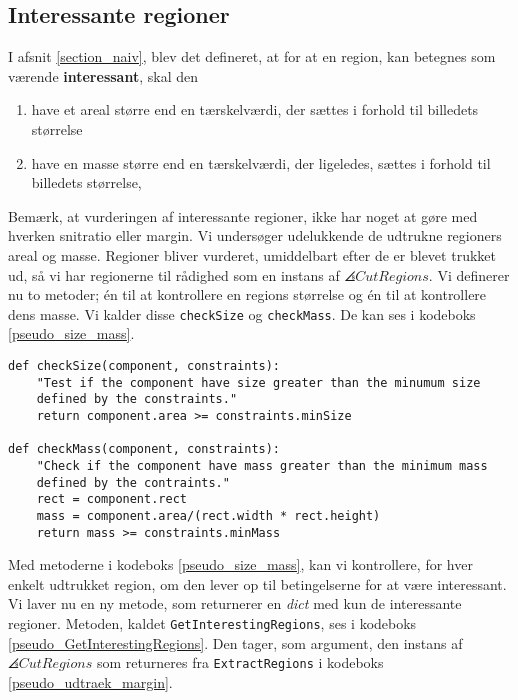 {\subsection{Interessante regioner}
I afsnit \ref{section_naiv}, blev det defineret, at for at en region,
kan betegnes som værende \textbf{interessant}, skal den
\begin{enumerate}
        \renewcommand{\labelenumi}{(\alph{enumi})}
    \item have et areal større end en tærskelværdi, der sættes i
        forhold til billedets størrelse
    \item have en masse større end en tærskelværdi, der ligeledes,
        sættes i forhold til billedets størrelse,
\end{enumerate}
Bemærk, at vurderingen af interessante regioner, ikke har noget at gøre
med hverken snitratio eller margin. Vi undersøger udelukkende de
udtrukne regioners areal og masse. Regioner bliver vurderet, umiddelbart
efter de er blevet trukket ud, så vi har regionerne til rådighed som en
instans af $\angles{CutRegions}$. Vi definerer nu to metoder; én til at
kontrollere en regions størrelse og én til at kontrollere dens masse. Vi
kalder disse \texttt{checkSize} og \texttt{checkMass}. De kan ses i
kodeboks \ref{pseudo_size_mass}.

\begin{lstlisting}[caption={Pseudokode},captionpos=b,label={pseudo_size_mass},
    frame=tb, breaklines=false, float=h]
def checkSize(component, constraints):
    "Test if the component have size greater than the minumum size
    defined by the constraints."
    return component.area >= constraints.minSize

def checkMass(component, constraints):
    "Check if the component have mass greater than the minimum mass
    defined by the contraints."
    rect = component.rect
    mass = component.area/(rect.width * rect.height)
    return mass >= constraints.minMass
\end{lstlisting}

Med metoderne i kodeboks \ref{pseudo_size_mass}, kan vi kontrollere, for
hver enkelt udtrukket region, om den lever op til betingelserne for at
være interessant. Vi laver nu en ny metode, som returnerer en
\emph{dict} med kun de interessante regioner. Metoden, kaldet
\texttt{GetInterestingRegions}, ses i kodeboks
\ref{pseudo_GetInterestingRegions}. Den tager, som argument, den instans
af $\angles{CutRegions}$ som returneres fra \texttt{ExtractRegions} i
kodeboks \ref{pseudo_udtraek_margin}.

}
